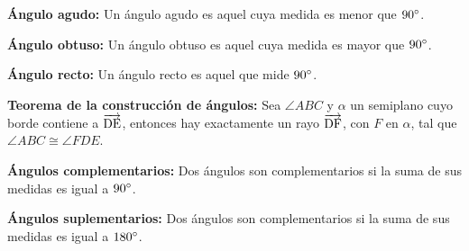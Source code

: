 \begin{definition}{\textbf{Ángulo agudo:}}
    Un ángulo agudo es aquel cuya medida es menor que $90^{\circ}$.
\end{definition}

\begin{definition}{\textbf{Ángulo obtuso:}}
    Un ángulo obtuso es aquel cuya medida es mayor que $90^{\circ}$.
\end{definition}

\begin{definition}{\textbf{Ángulo recto:}}
    Un ángulo recto es aquel que mide $90^{\circ}$.
\end{definition}

\clearpage

\begin{theorem}{\textbf{Teorema de la construcción de ángulos:}}
    Sea $\angle{ABC}$ y $\alpha$ un semiplano cuyo borde contiene a $\overrightarrow{\rm DE}$, entonces hay exactamente un rayo $\overrightarrow{\rm DF}$, con $F$ en $\alpha$, tal que $\angle{ABC} \cong \angle{FDE}$.

    \begin{figure}[h!]
    
        \centering
    
        \begin{subfigure}[b]{.3\textwidth}
            \centering
            
            \label{fig:postulate34}
        \end{subfigure}%
        \begin{subfigure}[b]{.3\textwidth}
            \centering
            
            \label{fig:postulate35}
        \end{subfigure}
    
        \label{fig:angle-const-theorem}
        
    \end{figure}        
    
\end{theorem}

\begin{definition}{\textbf{Ángulos complementarios:}}
    Dos ángulos son complementarios si la suma de sus medidas es igual a $90^{\circ}$.
\end{definition}

\begin{definition}{\textbf{Ángulos suplementarios:}}
    Dos ángulos son complementarios si la suma de sus medidas es igual a $180^{\circ}$.
\end{definition}

